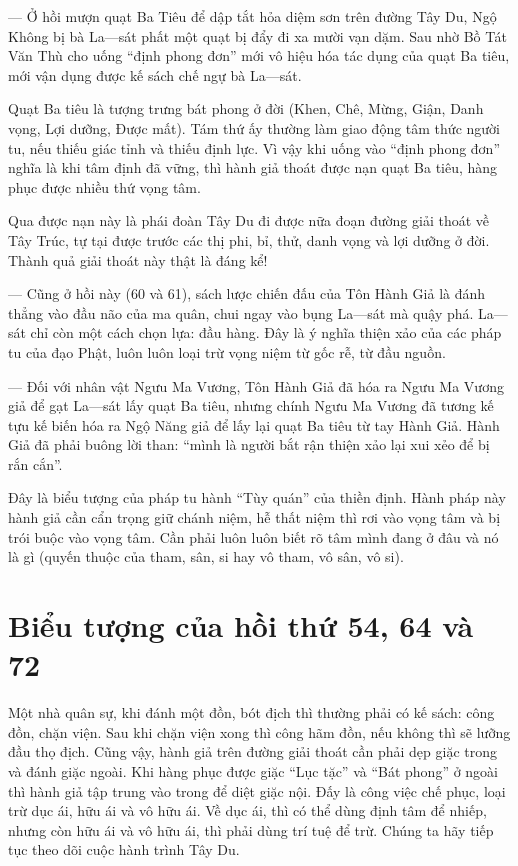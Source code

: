 — Ở hồi mượn quạt Ba Tiêu để dập tắt hỏa diệm sơn trên đường Tây Du, Ngộ Không bị bà La—sát phất một quạt bị đẩy đi xa mười vạn dặm. Sau nhờ Bồ Tát Văn Thù cho uống ``định phong đơn'' mới vô hiệu hóa tác dụng của quạt Ba tiêu, mới vận dụng được kế sách chế ngự bà La—sát.

Quạt Ba tiêu là tượng trưng bát phong ở đời (Khen, Chê, Mừng, Giận, Danh vọng, Lợi dưỡng, Được mất). Tám thứ ấy thường làm giao động tâm thức người tu, nếu thiếu giác tỉnh và thiếu định lực. Vì vậy khi uống vào ``định phong đơn'' nghĩa là khi tâm định đã vững, thì hành giả thoát được nạn quạt Ba tiêu, hàng phục được nhiều thứ vọng tâm.

Qua được nạn này là phái đoàn Tây Du đi được nữa đoạn đường giải thoát về Tây Trúc, tự tại được trước các thị phi, bỉ, thử, danh vọng và lợi dưỡng ở đời. Thành quả giải thoát này thật là đáng kể!

— Cũng ở hồi này (60 và 61), sách lược chiến đấu của Tôn Hành Giả là đánh thẳng vào đầu não của ma quân, chui ngay vào bụng La—sát mà quậy phá. La—sát chỉ còn một cách chọn lựa: đầu hàng. Đây là ý nghĩa thiện xảo của các pháp tu của đạo Phật, luôn luôn loại trừ vọng niệm từ gốc rễ, từ đầu nguồn.

— Đối với nhân vật Ngưu Ma Vương, Tôn Hành Giả đã hóa ra Ngưu Ma Vương giả để gạt La—sát lấy quạt Ba tiêu, nhưng chính Ngưu Ma Vương đã tương kế tựu kế biến hóa ra Ngộ Năng giả để lấy lại quạt Ba tiêu từ tay Hành Giả. Hành Giả đã phải buông lời than: ``mình là người bắt rận thiện xảo lại xui xẻo để bị rắn cắn''.

Đây là biểu tượng của pháp tu hành ``Tùy quán'' của thiền định. Hành pháp này hành giả cần cẩn trọng giữ chánh niệm, hễ thất niệm thì rơi vào vọng tâm và bị trói buộc vào vọng tâm. Cần phải luôn luôn biết rõ tâm mình đang ở đâu và nó là gì (quyến thuộc của tham, sân, si hay vô tham, vô sân, vô si).

\section{Biểu tượng của hồi thứ 54, 64 và 72} %
\label{sec:bieu_tuong_hoi_54_64_và_72}

Một nhà quân sự, khi đánh một đồn, bót địch thì thường phải có kế sách: công đồn, chặn viện. Sau khi chặn viện xong thì công hãm đồn, nếu không thì sẽ lưỡng đầu thọ địch. Cũng vậy, hành giả trên đường giải thoát cần phải dẹp giặc trong và đánh giặc ngoài. Khi hàng phục được giặc ``Lục tặc'' và ``Bát phong'' ở ngoài thì hành giả tập trung vào trong để diệt giặc nội. Đấy là công việc chế phục, loại trừ dục ái, hữu ái và vô hữu ái. Về dục ái, thì có thể dùng định tâm để nhiếp, nhưng còn hữu ái và vô hữu ái, thì phải dùng trí tuệ để trừ. Chúng ta hãy tiếp tục theo dõi cuộc hành trình Tây Du.

